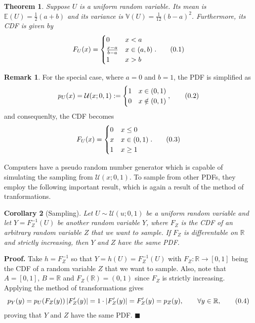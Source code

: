 \documentclass[10pt]{article}
\newtheorem{thm}{Theorem}[section]
\newtheorem{cor}[thm]{Corollary}
\theoremstyle{definition}
\newtheorem*{rem}{Remark}
\newenvironment{prf}{\noindent\textbf{Proof.}}{\hfill$\blacksquare$}
\newcommand\eqnum{\addtocounter{equation}{1}\tag{\arabic{section}.\arabic{equation}}}
\begin{document}
\begin{thm}
Suppose $U$ is a uniform random variable. Its mean is $\mathbb{E}(U) = \frac{1}{2}(a+b)$ and its variance is $\mathbb{V}(U)=\frac{1}{12}(b-a)^2$. Furthermore, its CDF is given by
\begin{equation*}
F_U(x) = 
\begin{cases} 
0 & x < a \\
\frac{x-a}{b-a} & x \in (a, b) \\
1 & x > b
\end{cases}.
\eqnum
\end{equation*}
\end{thm}
\begin{rem}
For the special case, where $a=0$ and $b=1$, the PDF is simplified as
\begin{equation*}
p_U(x) = \mathcal{U}(x; 0, 1) :=
\begin{cases} 
1 & x \in (0, 1) \\
0 & x \notin (0, 1)
\end{cases},
\eqnum
\end{equation*}
and consequenlty, the CDF becomes
\begin{equation*}
F_U(x) = 
\begin{cases} 
0 & x \leq 0 \\
x & x \in (0, 1) \\
1 & x \ge 1
\end{cases}.
\eqnum
\end{equation*}
\end{rem}
 Computers have a pseudo random number generator which is capable of simulating the sampling from $\mathcal{U}(x; 0, 1)$. To sample from other PDFs, they employ the following important result, which is again a result of the method of tranformations.
\begin{cor}[Sampling]\label{thm:sample}
Let $U\sim\mathcal{U}(u; 0, 1)$ be a uniform random variable  and let $Y=F_Z^{-1}(U)$ be another random variable $Y$, where $F_Z$ is the CDF of an arbitrary random variable $Z$ that we want to sample. If $F_Z$ is differentable on $\mathbb{R}$ and strictly increasing, then $Y$ and $Z$ have the same PDF.
\end{cor}
\begin{prf}
Take $h=F_Z^{-1}$ so that $Y=h(U) = F_Z^{-1}(U)$ with $F_Z:\mathbb{R} \to [0, 1]$ being the CDF of a random variable $Z$ that we want to sample. Also, note that $A=[0, 1]$, $B=\mathbb{R}$ and $F_Z(\mathbb{R})=(0, 1)$ since $F_Z$ is strictly increasing. Applying the method of transformations gives
\begin{equation*}
p_Y(y) = p_U(F_Z(y))\left|F_Z'(y)\right|=1\cdot\left|F_Z'(y)\right|= F_Z'(y)=p_Z(y),  \qquad \forall y \in \mathbb{R},
\eqnum
\end{equation*}
proving that $Y$ and $Z$ have the same PDF.
\end{prf}
\end{document}
